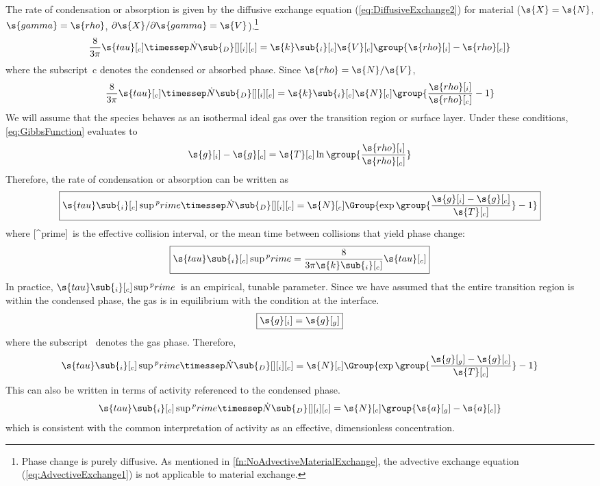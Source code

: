 The rate of condensation or absorption is given by the diffusive exchange equation (\ref{eq:DiffusiveExchange2}) for material ($\s{X} = \s{N}$, $\s{gamma} = \s{rho}$, $\partial\s{X}/\partial\s{gamma} = \s{V}$).\footnote{Phase change is purely diffusive.  As mentioned in \autoref{fn:NoAdvectiveMaterialExchange}, the advective exchange equation (\ref{eq:AdvectiveExchange1}) is not applicable to material exchange.}
\begin{equation}
  \label{eq:PhaseChange1a}
  \frac{8}{3\pi}\s{tau}[_c]\timessep\dot{N}\sub{_D}[ ][_i][_c] = \s{k}\sub{_i}[_c]\s{V}[_c]\group{\s{rho}[_i] - \s{rho}[_c]}
\end{equation}
where the subscript~c denotes the condensed or absorbed phase.  Since $\s{rho} = \s{N}/\s{V}$,
\begin{equation}
  \label{eq:PhaseChange2a}
  \frac{8}{3\pi}\s{tau}[_c]\timessep\dot{N}\sub{_D}[ ][_i][_c] = \s{k}\sub{_i}[_c]\s{N}[_c]\group{\frac{\s{rho}[_i]}{\s{rho}[_c]} - 1}
\end{equation}
We will assume that the species behaves as an isothermal ideal gas over the transition region or surface layer.  Under these conditions, \autoref{eq:GibbsFunction} evaluates to
\begin{equation}
  \s{g}[_i] - \s{g}[_c] = \s{T}[_c]\ln\group{\frac{\s{rho}[_i]}{\s{rho}[_c]}}
\end{equation}
Therefore, the rate of condensation or absorption can be written as
\begin{equation}
  \label{eq:PhaseChange}
  \boxed{\s{tau}\sub{_i}[_c]\sup{^prime}\timessep\dot{N}\sub{_D}[ ][_i][_c] = \s{N}[_c]\Group{\exp\group{\frac{\s{g}[_i] - \s{g}[_c]}{\s{T}[_c]}} - 1}}
\end{equation}
where [^prime]~is the effective collision interval, or the mean time between collisions that yield phase change:
\begin{equation}
  \label{eq:EffectiveCollisionInterval}
  \boxed{\s{tau}\sub{_i}[_c]\sup{^prime} = \frac{8}{3\pi\s{k}\sub{_i}[_c]}\s{tau}[_c]}
\end{equation}
In practice, $\s{tau}\sub{_i}[_c]\sup{^prime}$~is an empirical, tunable parameter.  Since we have assumed that the entire transition region is within the condensed phase, the gas is in equilibrium with the condition at the interface.
\begin{equation}
  \label{eq:PhaseChange3b}
  \boxed{\s{g}[_i] = \s{g}[_g]}
\end{equation}
where the subscript~ denotes the gas phase.  Therefore,
\begin{equation}
  \label{eq:PhaseChange4}
  \s{tau}\sub{_i}[_c]\sup{^prime}\timessep\dot{N}\sub{_D}[ ][_i][_c] = \s{N}[_c]\Group{\exp\group{\frac{\s{g}[_g] - \s{g}[_c]}{\s{T}[_c]}} - 1}
\end{equation}
This can also be written in terms of activity referenced to the condensed phase.
\begin{equation}
  \s{tau}\sub{_i}[_c]\sup{^prime}\timessep\dot{N}\sub{_D}[ ][_i][_c] = \s{N}[_c]\group{\s{a}[_g] - \s{a}[_c]}
\end{equation}
which is consistent with the common interpretation of activity as an effective, dimensionless concentration.


